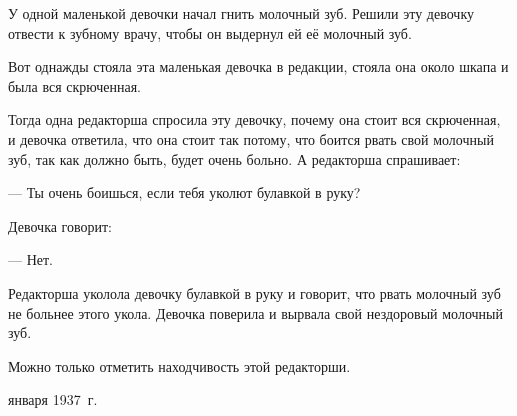 У одной маленькой девочки начал гнить молочный зуб.
Решили эту девочку отвести к зубному врачу, чтобы он выдернул ей её молочный зуб.

Вот однажды стояла эта маленькая девочка в редакции, стояла она около шкапа
и была вся скрюченная.

Тогда одна редакторша спросила эту девочку, почему она стоит вся скрюченная,
и девочка ответила, что она стоит так потому, что боится рвать свой молочный зуб,
так как должно быть, будет очень больно. А редакторша спрашивает:

--- Ты очень боишься, если тебя уколют булавкой в руку?

Девочка говорит:

--- Нет.

Редакторша уколола девочку булавкой в руку и говорит, что рвать молочный зуб
не больнее этого укола. Девочка поверила и вырвала свой нездоровый молочный зуб.

Можно только отметить находчивость этой редакторши.

\medskip
{} января 1937~г.